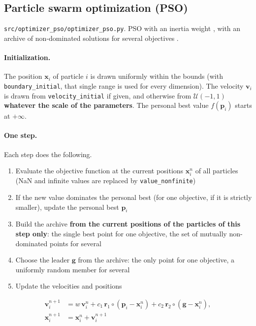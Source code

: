 \documentclass[11pt,a4paper]{article}
\begin{document}
\subsection{Particle swarm optimization (PSO)}\label{sec:pso}

\texttt{src/optimizer\_pso/optimizer\_pso.py}. PSO with an inertia weight \cite{kennedy1995,shi1998}, with an archive of non-dominated solutions for several objectives \cite{coello2004}.

\paragraph{Initialization.} The position $\mathbf{x}_i$ of particle $i$ is drawn uniformly within the bounds (with \texttt{boundary\_initial}, that single range is used for every dimension). The velocity $\mathbf{v}_i$ is drawn from \texttt{velocity\_initial} if given, and otherwise from $\mathcal{U}(-1, 1)$ \textbf{whatever the scale of the parameters}. The personal best value $f(\mathbf{p}_i)$ starts at $+\infty$.

\paragraph{One step.} Each step does the following.

\begin{enumerate}
\item Evaluate the objective function at the current positions $\mathbf{x}_i^n$ of all particles (NaN and infinite values are replaced by \texttt{value\_nonfinite})
\item If the new value dominates the personal best (for one objective, if it is strictly smaller), update the personal best $\mathbf{p}_i$
\item Build the archive \textbf{from the current positions of the particles of this step only}: the single best point for one objective, the set of mutually non-dominated points for several
\item Choose the leader $\mathbf{g}$ from the archive: the only point for one objective, a uniformly random member for several
\item Update the velocities and positions
\end{enumerate}

\begin{align}
  \mathbf{v}_i^{n+1} &= w\,\mathbf{v}_i^{n} + c_1\,\mathbf{r}_1 \circ (\mathbf{p}_i - \mathbf{x}_i^{n}) + c_2\,\mathbf{r}_2 \circ (\mathbf{g} - \mathbf{x}_i^{n}), \\
  \mathbf{x}_i^{n+1} &= \mathbf{x}_i^{n} + \mathbf{v}_i^{n+1}
\end{align}
\end{document}
